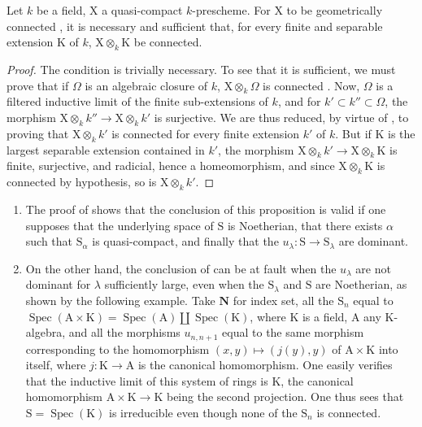 \begin{corollary}[8.4.5]
\label{IV.8.4.5}
Let $k$ be a field, $\mathrm{X}$ a quasi-compact $k$-prescheme.
For $\mathrm{X}$ to be geometrically connected , it is necessary and sufficient that, for every finite and separable extension $\mathrm{K}$ of $k$, $\mathrm{X}\otimes_k\mathrm{K}$ be connected.
\end{corollary}

\begin{proof}
The condition is trivially necessary.
To see that it is sufficient, we must prove that if $\Omega$ is an algebraic closure of $k$, $\mathrm{X}\otimes_k\Omega$ is connected .
Now, $\Omega$ is a filtered inductive limit of the finite sub-extensions of $k$, and for $k'\subset k''\subset\Omega$, the morphism $\mathrm{X}\otimes_k k''\to\mathrm{X}\otimes_k k'$ is surjective.
We are thus reduced, by virtue of , to proving that $\mathrm{X}\otimes_k k'$ is connected for every finite extension $k'$ of $k$.
But if $\mathrm{K}$ is the largest separable extension contained in $k'$, the morphism $\mathrm{X}\otimes_k k'\to\mathrm{X}\otimes_k\mathrm{K}$ is finite, surjective, and radicial, hence  a homeomorphism, and since $\mathrm{X}\otimes_k\mathrm{K}$ is connected by hypothesis, so is $\mathrm{X}\otimes_k k'$.
\end{proof}

\begin{remark}[8.4.6]
\label{IV.8.4.6}
\begin{enumerate}[label=(\roman*)]
  \item The proof of  shows that the conclusion of this proposition is valid if one supposes that the underlying space of $\mathrm{S}$ is Noetherian, that there exists $\alpha$ such that $\mathrm{S}_\alpha$ is quasi-compact, and finally that the $u_\lambda:\mathrm{S}\to\mathrm{S}_\lambda$ are dominant.
  \item On the other hand, the conclusion of  can be at fault when the $u_\lambda$ are not dominant for $\lambda$ sufficiently large, even when the $\mathrm{S}_\lambda$ and $\mathrm{S}$ are Noetherian, as shown by the following example.
Take $\mathbf{N}$ for index set, all the $\mathrm{S}_n$ equal to $\operatorname{Spec}(\mathrm{A}\times\mathrm{K})=\operatorname{Spec}(\mathrm{A})\amalg\operatorname{Spec}(\mathrm{K})$, where $\mathrm{K}$ is a field, $\mathrm{A}$ any $\mathrm{K}$-algebra, and all the morphisms $u_{n,n+1}$ equal to the same morphism corresponding to the homomorphism $(x,y)\mapsto(j(y),y)$ of $\mathrm{A}\times\mathrm{K}$ into itself, where $j:\mathrm{K}\to\mathrm{A}$ is the canonical homomorphism.
One easily verifies that the inductive limit of this system of rings is $\mathrm{K}$, the canonical homomorphism $\mathrm{A}\times\mathrm{K}\to\mathrm{K}$ being the second projection.
One thus sees that $\mathrm{S}=\operatorname{Spec}(\mathrm{K})$ is irreducible even though none of the $\mathrm{S}_n$ is connected.
\end{enumerate}
\end{remark}

